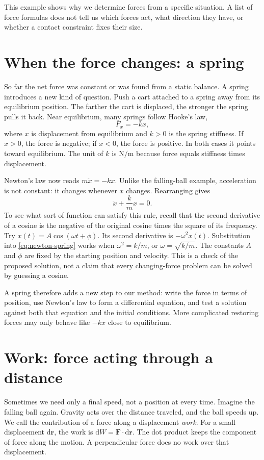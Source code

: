 \documentclass[11pt,oneside]{book}
\newcommand{\dd}{\mathrm{d}}
\newcommand{\vect}[1]{\boldsymbol{#1}}
\theoremstyle{reviewstyle}
\begin{document}
This example shows why we determine forces from a specific situation. A list of force formulas does not tell us which forces act, what direction they have, or whether a contact constraint fixes their size.

\section{When the force changes: a spring}
So far the net force was constant or was found from a static balance. A spring introduces a new kind of question. Push a cart attached to a spring away from its equilibrium position. The farther the cart is displaced, the stronger the spring pulls it back. Near equilibrium, many springs follow Hooke's law,
\begin{equation}
F_x=-kx,
\end{equation}
where $x$ is displacement from equilibrium and $k>0$ is the spring stiffness. If $x>0$, the force is negative; if $x<0$, the force is positive. In both cases it points toward equilibrium. The unit of $k$ is $\mathrm{N/m}$ because force equals stiffness times displacement.

Newton's law now reads $m\ddot x=-kx$. Unlike the falling-ball example, acceleration is not constant: it changes whenever $x$ changes. Rearranging gives
\begin{equation}
\ddot x+\frac{k}{m}x=0.
\label{eq:newton-spring}
\end{equation}
To see what sort of function can satisfy this rule, recall that the second derivative of a cosine is the negative of the original cosine times the square of its frequency. Try $x(t)=A\cos(\omega t+\phi)$. Its second derivative is $-\omega^2x(t)$. Substitution into \eqref{eq:newton-spring} works when $\omega^2=k/m$, or $\omega=\sqrt{k/m}$. The constants $A$ and $\phi$ are fixed by the starting position and velocity. This is a check of the proposed solution, not a claim that every changing-force problem can be solved by guessing a cosine.

A spring therefore adds a new step to our method: write the force in terms of position, use Newton's law to form a differential equation, and test a solution against both that equation and the initial conditions. More complicated restoring forces may only behave like $-kx$ close to equilibrium.

\section{Work: force acting through a distance}
Sometimes we need only a final speed, not a position at every time. Imagine the falling ball again. Gravity acts over the distance traveled, and the ball speeds up. We call the contribution of a force along a displacement \emph{work}. For a small displacement $\dd\vect r$, the work is $\dd W=\vect F\cdot\dd\vect r$. The dot product keeps the component of force along the motion. A perpendicular force does no work over that displacement.
\end{document}
